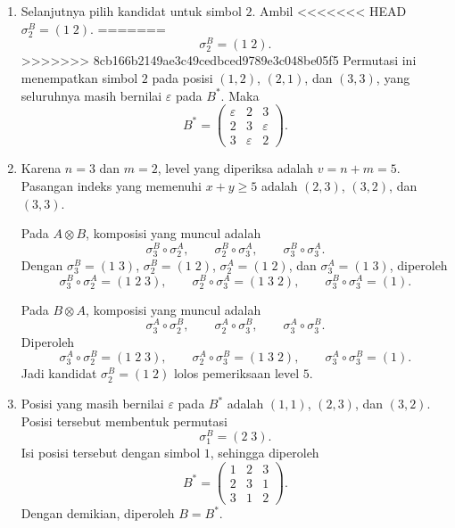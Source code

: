 \begin{contoh}
\begin{enumerate}
    \item Selanjutnya pilih kandidat untuk simbol $2$. Ambil
<<<<<<< HEAD
          $
            \sigma_2^B=(1\;2).
          $
=======
          \[
            \sigma_2^B=(1\;2).
          \]
>>>>>>> 8cb166b2149ae3c49cedbced9789e3c048be05f5
          Permutasi ini menempatkan simbol $2$ pada posisi $(1,2)$, $(2,1)$,
          dan $(3,3)$, yang seluruhnya masih bernilai $\varepsilon$ pada
          $B^*$. Maka
          \[
            B^*=
            \begin{pmatrix}
              \varepsilon & 2           & 3           \\
              2           & 3           & \varepsilon \\
              3           & \varepsilon & 2
            \end{pmatrix}.
          \]

    \item Karena $n=3$ dan $m=2$, level yang diperiksa adalah $v=n+m=5$.
          Pasangan indeks yang memenuhi $x+y\ge 5$ adalah $(2,3)$, $(3,2)$,
          dan $(3,3)$.

          Pada $A\otimes B$, komposisi yang muncul adalah
          \[
            \sigma_3^B\circ\sigma_2^A,\qquad
            \sigma_2^B\circ\sigma_3^A,\qquad
            \sigma_3^B\circ\sigma_3^A.
          \]
          Dengan $\sigma_3^B=(1\;3)$, $\sigma_2^B=(1\;2)$,
          $\sigma_2^A=(1\;2)$, dan $\sigma_3^A=(1\;3)$, diperoleh
          \[
            \sigma_3^B\circ\sigma_2^A=(1\;2\;3),\qquad
            \sigma_2^B\circ\sigma_3^A=(1\;3\;2),\qquad
            \sigma_3^B\circ\sigma_3^A=(1).
          \]

          Pada $B\otimes A$, komposisi yang muncul adalah
          \[
            \sigma_3^A\circ\sigma_2^B,\qquad
            \sigma_2^A\circ\sigma_3^B,\qquad
            \sigma_3^A\circ\sigma_3^B.
          \]
          Diperoleh
          \[
            \sigma_3^A\circ\sigma_2^B=(1\;2\;3),\qquad
            \sigma_2^A\circ\sigma_3^B=(1\;3\;2),\qquad
            \sigma_3^A\circ\sigma_3^B=(1).
          \]
          Jadi kandidat $\sigma_2^B=(1\;2)$ lolos pemeriksaan level $5$.

    \item Posisi yang masih bernilai $\varepsilon$ pada $B^*$ adalah
          $(1,1)$, $(2,3)$, dan $(3,2)$. Posisi tersebut membentuk permutasi
          \[
            \sigma_1^B=(2\;3).
          \]
          Isi posisi tersebut dengan simbol $1$, sehingga diperoleh
          \[
            B^*=
            \begin{pmatrix}
              1 & 2 & 3 \\
              2 & 3 & 1 \\
              3 & 1 & 2
            \end{pmatrix}.
          \]
          Dengan demikian, diperoleh $B=B^*$.


\end{enumerate}
\end{contoh}
